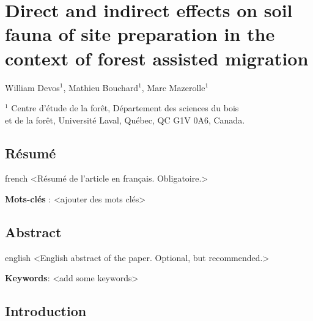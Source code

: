 \chapter{Direct and indirect effects on soil fauna of site preparation in the context of forest assisted migration}     %
\label{chapitre1-articles}    

William Devos$^1$, Mathieu Bouchard$^1$, Marc Mazerolle$^1$

$^1$ Centre d'étude de la forêt, Département des sciences du bois \\ 
et de la forêt, Université Laval, Québec, QC G1V 0A6, Canada. \\ 

\clearpage

\section*{Résumé}
\label{sec:resume1}

\begin{otherlanguage*}{french}
  <Résumé de l'article en français. Obligatoire.>

  \textbf{Mots-clés} : <ajouter des mots clés>
\end{otherlanguage*}

\clearpage

\section*{Abstract}
\label{sec:abstract1}

\begin{otherlanguage*}{english}
  <English abstract of the paper. Optional, but recommended.>

\textbf{Keywords}: <add some keywords> 
\end{otherlanguage*}

\cleardoublepage

\section*{Introduction}
\label{sec:intro1}


